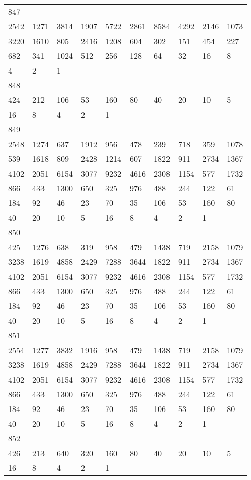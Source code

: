 \begin{longtable}{*{10}{l}}
847&&&&&&&&&\\
2542& 1271& 3814& 1907& 5722& 2861& 8584& 4292& 2146& 1073\\
3220& 1610& 805& 2416& 1208& 604& 302& 151& 454& 227\\
682& 341& 1024& 512& 256& 128& 64& 32& 16& 8\\
4& 2& 1& \\

848&&&&&&&&&\\
424& 212& 106& 53& 160& 80& 40& 20& 10& 5\\
16& 8& 4& 2& 1& \\

849&&&&&&&&&\\
2548& 1274& 637& 1912& 956& 478& 239& 718& 359& 1078\\
539& 1618& 809& 2428& 1214& 607& 1822& 911& 2734& 1367\\
4102& 2051& 6154& 3077& 9232& 4616& 2308& 1154& 577& 1732\\
866& 433& 1300& 650& 325& 976& 488& 244& 122& 61\\
184& 92& 46& 23& 70& 35& 106& 53& 160& 80\\
40& 20& 10& 5& 16& 8& 4& 2& 1& \\

850&&&&&&&&&\\
425& 1276& 638& 319& 958& 479& 1438& 719& 2158& 1079\\
3238& 1619& 4858& 2429& 7288& 3644& 1822& 911& 2734& 1367\\
4102& 2051& 6154& 3077& 9232& 4616& 2308& 1154& 577& 1732\\
866& 433& 1300& 650& 325& 976& 488& 244& 122& 61\\
184& 92& 46& 23& 70& 35& 106& 53& 160& 80\\
40& 20& 10& 5& 16& 8& 4& 2& 1& \\

851&&&&&&&&&\\
2554& 1277& 3832& 1916& 958& 479& 1438& 719& 2158& 1079\\
3238& 1619& 4858& 2429& 7288& 3644& 1822& 911& 2734& 1367\\
4102& 2051& 6154& 3077& 9232& 4616& 2308& 1154& 577& 1732\\
866& 433& 1300& 650& 325& 976& 488& 244& 122& 61\\
184& 92& 46& 23& 70& 35& 106& 53& 160& 80\\
40& 20& 10& 5& 16& 8& 4& 2& 1& \\

852&&&&&&&&&\\
426& 213& 640& 320& 160& 80& 40& 20& 10& 5\\
16& 8& 4& 2& 1& \\


\end{longtable}
